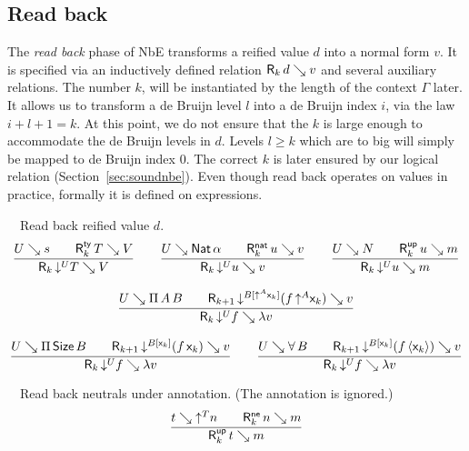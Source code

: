 \documentclass[acmsmall,screen]{acmart}\settopmatter{}
\begin{document}
\subsection{Read back}
\label{sec:read}

The \emph{read back} phase of NbE \cite{gregoireLeroy:icfp02}
transforms a reified value $d$ into a normal form $v$.  It is
specified via an inductively defined relation $\mathsf{R}_{k} \, d \searrow v$ and several auxiliary relations.
The number $k$, will be instantiated by the length of the context
$\Gamma$ later.  It allows us to transform a de Bruijn level $l$ into a de
Bruijn index $i$, via the law $i + l + 1 = k$.  At this point, we do
not ensure that the $k$ is large enough to accommodate the de Bruijn
levels in $d$.  Levels $l \geq k$ which are to big will simply be mapped
to de Bruijn index $0$.  The correct $k$ is later ensured by our
logical relation (Section~\ref{sec:soundnbe}).
Even though read back operates on values in practice, formally it is
defined on expressions.

\noindent
{}\ \ Read back reified value $d$.
\begin{gather*}
  \ru{U \evalsto s \qquad
      \RTy k T V
    }{\R k {\down{U} T} V}
\qquad
  \ru{U \evalsto \Nat \alpha \qquad
      \RNat k u v
    }{\R k {\down{U} u} v}
\qquad
  \ru{U \evalsto N \qquad
      \RUp k u m
    }{\R k {\down{U} u} m}
\\[2ex]
  \ru{U \evalsto \piT A B \qquad
      \R{k+1} {\down{B[\up A \lev k]} (f\,\up A \lev k)} v
    }{\R k {\down{U} f} {\lambda v}}
\\[2ex]
  \ru{U \evalsto \piT \Size B \qquad
      \R{k+1} {\down{B[\lev k]} (f\,\lev k)} v
    }{\R k {\down{U} f} {\lambda v}}
\qquad
  \ru{U \evalsto \forallT B \qquad
      \R{k+1} {\down{B[\lev k]} (f\,\ann{\lev k})} v
    }{\R k {\down{U} f} {\lambda v}}
\end{gather*}

\noindent
{}\ \  Read back neutrals under annotation.  (The annotation is ignored.)
\begin{gather*}
  \ru{t \evalsto \up T n \qquad
      \RNe k n m
    }{\RUp k t m}
\end{gather*}
\end{document}
